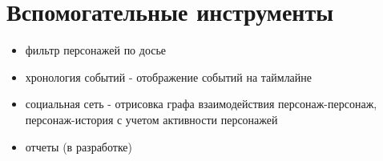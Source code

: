 \documentclass[a4paper,oneside,10pt,russian]{sphinxmanual}
\begin{document}
\section{Вспомогательные инструменты}
\label{toolsEnum:id3}\begin{itemize}
\item {}
фильтр персонажей по досье

\item {}
хронология событий - отображение событий на таймлайне

\item {}
социальная сеть - отрисовка графа взаимодействия персонаж-персонаж, персонаж-история с учетом активности персонажей

\item {}
отчеты (в разработке)

\end{itemize}
\end{document}
